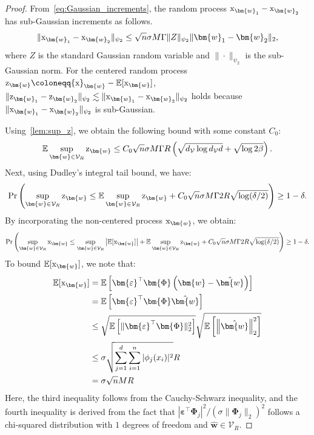 \documentclass{article}
\def\rx{{\textnormal{x}}}
\def\rz{{\textnormal{z}}}
\theoremstyle{plain}
\theoremstyle{definition}
\theoremstyle{remark}
\begin{document}
\begin{proof}[Proof]
From~\cref{eq:Gaussian_increments}, the random process \(\rx_{\bm{w}_1} - \rx_{\bm{w}_2}\) has sub-Gaussian increments as follows.
\begin{align*}
    \|\rx_{\bm{w}_1}-\rx_{\bm{w}_2}\|_{\psi_2} \leq \sqrt{n}\sigma M \Gamma \|Z\|_{\psi_2} \| \bm{w}_1- \bm{w}_2\|_2,
\end{align*}
where \(Z\) is the standard Gaussian random variable and \(\|\cdot\|_{\psi_2}\) is the sub-Gaussian norm.
For the centered random process \(\rz_{\bm{w}} \coloneqq \rx_{\bm{w}} - \mathbb{E}[\rx_{\bm{w}}] \), \(\|\rz_{\bm{w}_1}-\rz_{\bm{w}_2}\|_{\psi_2} \lesssim \|\rx_{\bm{w}_1}-\rx_{\bm{w}_2}\|_{\psi_2}\) holds because \(\|\rx_{\bm{w}_1}-\rx_{\bm{w}_2}\|_{\psi_2}\) is sub-Gaussian.

Using~\cref{lem:sup_z}, we obtain the following bound with some constant $C_0$:
\begin{align}
    \label{eq:sup_z}
    \mathbb{E}\sup_{\bm{w} \in \mathcal{V}_R} \rz_{\bm{w}}\leq C_0 \sqrt{n}\sigma M \Gamma R \left( \sqrt{d_{\mathcal{V}}\log d_{\mathcal{V}}d} + \sqrt{\log 2\beta} \right).
\end{align}
Next, using Dudley's integral tail bound, we have:
\begin{align*}
    \Pr\left(\sup_{\bm{w} \in \mathcal{V}_R} \rz_{\bm{w}} \leq  \mathbb{E}\sup_{\bm{w} \in \mathcal{V}_R} \rz_{\bm{w}} + C_0 \sqrt{n}\sigma M \Gamma 2R \sqrt{\log (\delta/2)}\right) \geq 1 - \delta.
\end{align*}
By incorporating the non-centered process \(\rx_{\bm{w}}\), we obtain:
\begin{align}
    \label{eq:tail_xb}
    \Pr\left(\sup_{\bm{w} \in \mathcal{V}_R} \rx_{\bm{w}} \leq \sup_{\bm{w} \in \mathcal{V}_R} \left|\mathbb{E}[\rx_{\bm{w}}]\right| + \mathbb{E}\sup_{\bm{w} \in \mathcal{V}_R} \rz_{\bm{w}} + C_0 \sqrt{n}\sigma M \Gamma 2R \sqrt{\log (\delta/2)}\right) \geq 1 - \delta.
\end{align}
To bound \(\mathbb{E}[\rx_{\bm{w}}]\), we note that:
\begin{align}
    \begin{aligned}
    \label{eq:e_xb}
    \mathbb{E}[\rx_{\bm{w}}] &= \mathbb{E}\left[ \bm{\varepsilon}^{\top}  \bm{\Phi} \left(\bm{w}- \hat{\bm{w}}\right) \right] \\
    &= \mathbb{E}\left[ \bm{\varepsilon}^{\top} \bm{\Phi} \hat{\bm{w}} \right] \\
    &\leq \sqrt{\mathbb{E}\left[ \|\bm{\varepsilon}^{\top} \bm{\Phi}\|_2^2\right]}\sqrt{\mathbb{E}\left[\left\| \hat{\bm{w}} \right\|^2_2\right]} \\
    &\leq \sigma \sqrt{\sum_{j=1}^d \sum_{i=1}^n |\phi_j(x_i)|^2} R \\
    &= \sigma \sqrt{n} M R
    \end{aligned}
\end{align}
Here, the third inequality follows from the Cauchy-Schwarz inequality, and the fourth inequality is derived from the fact that \(|\bm{\varepsilon}^{\top} \bm{\Phi}_j|^2 / (\sigma \|\bm{\Phi}_j\|_2)^2\) follows a chi-squared distribution with \(1\) degrees of freedom and \(\hat{\bm{w}} \in \mathcal{V}_R\). 


\end{proof}
\end{document}
